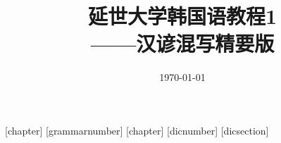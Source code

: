\usepackage[space]{xeCJK}
\usepackage{BOONDOX-cal, amsmath, amssymb, bm, graphicx, hyperref, mathrsfs, fontspec}
\usepackage{pxrubrica}
\usepackage{xcolor}
\usepackage{footnote}
\usepackage{diagbox}
\usepackage{booktabs}
\usepackage{multirow}
\usepackage{fancyhdr}
\usepackage{bbding}
\usepackage{tabularx}
\setcounter{tocdepth}{3}
\title{{\Huge{\textbf{延世大学韩国语教程1}}}\\——汉谚混写精要版}
\author{}
\date{\today}
\linespread{1.5}
\newcommand{\kr}{\CJKfamily{hanr}}
[chapter]
[grammarnumber]
\renewcommand{\thegrammarsection}{\arabic{chapter}.\arabic{grammarnumber} G\arabic{grammarsection}}
\newenvironment{grammar}{\stepcounter{grammarnumber}}{}
\newenvironment{grammarsect}[1][]{\refstepcounter{grammarsection}\par\noindent{\large\arabic{chapter}.\arabic{grammarnumber} G\arabic{grammarsection} #1}\addcontentsline{toc}{subsection}{\thegrammarsection {}  #1}}{\par}
[chapter]
[dicnumber]
\newenvironment{dic}{\stepcounter{dicnumber}}{}
\newenvironment{dicsect}{\stepcounter{dicsection}\par\noindent{\large\arabic{chapter}.\arabic{dicnumber} D\arabic{dicsection}\\}}{\par}
[dicsection]
\newcommand{\con}{\stepcounter{conversation}\theconversation )}

